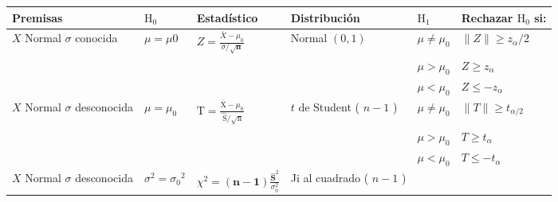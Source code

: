 \documentclass[
]{article}
\begin{document}
\begin{longtable}[]{@{}
  >{\raggedright\arraybackslash}p{}
  >{\raggedright\arraybackslash}p{}
  >{\raggedright\arraybackslash}p{}
  >{\raggedright\arraybackslash}p{}
  >{\raggedright\arraybackslash}p{}
  >{\raggedright\arraybackslash}p{}@{}}
\toprule\noalign{}
\begin{minipage}[b]{\linewidth}\raggedright
Premisas
\end{minipage} & \begin{minipage}[b]{\linewidth}\raggedright
\(\mathrm{H}_{0}\)
\end{minipage} & \begin{minipage}[b]{\linewidth}\raggedright
Estadístico
\end{minipage} & \begin{minipage}[b]{\linewidth}\raggedright
Distribución
\end{minipage} & \begin{minipage}[b]{\linewidth}\raggedright
\(\mathrm{H}_{1}\)
\end{minipage} & \begin{minipage}[b]{\linewidth}\raggedright
Rechazar \(\mathrm{H}_{0}\) si:
\end{minipage} \\
\midrule\noalign{}
\endhead
\bottomrule\noalign{}
\endlastfoot
\(X\) Normal \(\sigma\) conocida & \(\mu=\mu 0\) & \(Z=\frac{\bar{X}-\mu_{0}}{\sigma / \sqrt{\mathbf{n}}}\) & Normal \((0,1)\) & \(\mu \neq \mu_{0}\) & \(\|Z\| \geq z_{\alpha} / 2\) \\
& & & & \(\mu>\mu_{0}\) & \(Z \geq z_{\alpha}\) \\
& & & & \(\mu<\mu_{0}\) & \(Z \leq-z_{\alpha}\) \\
\(X\) Normal \(\sigma\) desconocida & \(\mu=\mu_{0}\) & \(\mathrm{T}=\frac{\overline{\mathrm{X}}-\mu_{0}}{\hat{\mathrm{~S}} / \sqrt{\mathrm{n}}}\) & \(t\) de Student ( \(n-1\) ) & \(\mu \neq \mu_{0}\) & \(\|T\| \geq t_{\alpha / 2}\) \\
& & & & \(\mu>\mu_{0}\) & \(T \geq t_{\alpha}\) \\
& & & & \(\mu<\mu_{0}\) & \(T \leq-t_{\alpha}\) \\
\(X\) Normal \(\sigma\) desconocida & \(\sigma^{2}=\sigma_{0}{ }^{2}\) & \(\chi^{2}=(\mathbf{n}-\mathbf{1}) \frac{\hat{\mathbf{S}}^{2}}{\sigma_{0}^{2}}\) & Ji al cuadrado ( \(n-1\) ) & & \\

\end{longtable}
\end{document}
